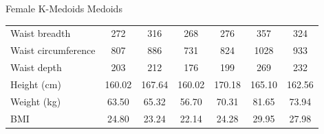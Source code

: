 \documentclass[10pt]{beamer}
\begin{document}
\begin{frame}{Female K-Medoids Medoids}
\begin{tabular}{lcccccc}
		Waist breadth                & 272                                  & 316        & 268        & 276        & 357        & 324        \\
		Waist circumference          & 807                                  & 886        & 731        & 824        & 1028       & 933        \\
		Waist depth                  & 203                                  & 212        & 176        & 199        & 269        & 232        \\
		\hline
		Height (cm)                  & 160.02                               & 167.64     & 160.02     & 170.18     & 165.10     & 162.56     \\
		Weight (kg)                  & 63.50                                & 65.32      & 56.70      & 70.31      & 81.65      & 73.94      \\
		BMI                          & 24.80                                & 23.24      & 22.14      & 24.28      & 29.95      & 27.98
	\end{tabular}
\end{frame}
\end{document}
